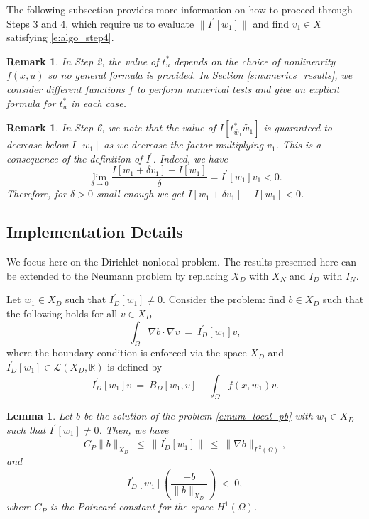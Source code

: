 \documentclass[11pt]{amsart}   	%
\theoremstyle{plain}
\numberwithin{equation}{section}
\newtheorem{lemma}[thm]{Lemma}
\newtheorem{remark}[thm]{Remark}
\begin{document}
The following subsection provides more information on how to proceed through Steps 3 and 4,  which require us to evaluate $\|I^\prime[w_1]\|$ and find $v_1\in X$ satisfying \eqref{e:algo_step4}.

\begin{remark}\label{remark:algo_step2_old}
In Step 2, the value of $t^*_u$ depends on the choice of nonlinearity $f(x,u)$ so no general formula is provided. In Section \ref{s:numerics_results}, we consider different functions $f$ to perform numerical tests and give an explicit formula for $t^*_u$ in each case.
\end{remark}

\begin{remark}\label{remark:algo_step6_old}
In Step 6, we note that the value of $I[t^*_{\tilde{w_1}} \tilde{w_1}]$ is guaranteed to decrease below $I[w_1]$ as we decrease the factor multiplying $v_1$. This is a consequence of the definition of $I^\prime$. Indeed, we have
$$\lim_{\delta\rightarrow 0} \frac{I[w_1 + \delta v_1] - I[w_1]}{\delta} = I^\prime[w_1] v_1 < 0.$$
Therefore, for $\delta>0$ small enough we get $I[w_1 + \delta v_1] - I[w_1] < 0$.
\end{remark}


\subsection{Implementation Details}

We focus here on the Dirichlet nonlocal problem. The results presented here can be extended to the Neumann problem by replacing $X_D$ with $X_N$ and $I_D$ with $I_N$. 

Let $w_1\in X_D$ such that $I_D^\prime[w_1]\neq 0$. Consider the problem: find $b \in X_D$ such that the following holds for all $v\in X_D$
\begin{equation}\label{e:num_local_pb_old}
    \int_\Omega \nabla b \cdot \nabla v \ = \ I_D^\prime[w_1]v,
\end{equation}
where the boundary condition is enforced via the space $X_D$ and $I^\prime_D[w_1] \in \mathcal{L}(X_D,\mathbb{R})$ is defined by
$$I^\prime_D[w_1]v 
\ = \  B_D[w_1,v] - \int_\Omega f(x,w_1)v .$$


\begin{lemma}\label{lemma:num_algo_details_old}
Let $b$ be the solution of the problem \ref{e:num_local_pb} with $w_1\in X_D$ such that $I^\prime[w_1]\neq 0$.
Then, we have
$$C_P \| b\|_{X_D} \ \leq \ \|I_D^\prime[w_1]\| \ \leq \ \| \nabla b\|_{L^2(\Omega)},$$
and
$$ I_D^\prime[w_1] \left(\frac{-b}{\|b\|_{X_D}}\right) \ < \ 0,$$
where $C_P$ is the Poincar\'e constant for the space $H^1(\Omega)$.
\end{lemma}
\end{document}
